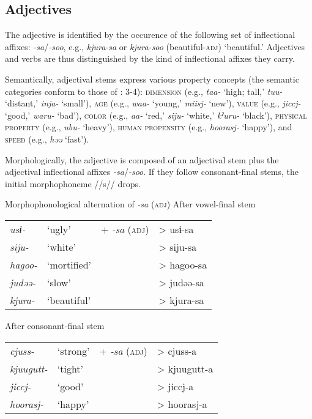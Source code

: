 \subsection{Adjectives}\label{sec:4.3.4}

The adjective is identified by the occurence of the following set of inflectional affixes: \textit{{}-sa}/\textit{{}-soo}, e.g., \textit{kjura-sa} or \textit{kjura-soo} (beautiful-\textsc{adj}) ‘beautiful.’ Adjectives and verbs are thus distinguished by the kind of inflectional affixes they carry.

Semantically, adjectival stems express various property concepts (the semantic categories conform to those of \citealt{Dixon2004}: 3-4): \textsc{dimension} (e.g., \textit{taa-} ‘high; tall,’ \textit{tuu-} ‘distant,’ \textit{inja-} ‘small’), \textsc{age} (e.g., \textit{waa-} ‘young,’ \textit{miisj-} ‘new’), \textsc{value} (e.g., \textit{jiccj-} ‘good,’ \textit{waru-} ‘bad’), \textsc{color} (e.g., \textit{aa-} ‘red,’ \textit{siju-} ‘white,’ \textit{kˀuru-} ‘black’), \textsc{physical} \textsc{property} (e.g., \textit{ubu-} ‘heavy’), \textsc{human} \textsc{propensity} (e.g., \textit{hoorasj-} ‘happy’), and \textsc{speed} (e.g., \textit{həə} ‘fast’).

Morphologically, the adjective is composed of an adjectival stem plus the adjectival inflectional affixes \textit{{}-sa}/\textit{{}-soo}. If they follow consonant-final stems, the initial morphophoneme //s// drops.

\ea  Morphophonological alternation of \textit{{}-sa} (\textsc{adj}) \label{ex:4.49}
  \ea After vowel-final stem\\
\begin{tabular}{@{}llll@{}}
    \textit{usɨ-}   & ‘ugly’        & +  \textit{{}-sa} (\textsc{adj}) & >  usɨ-sa  \\
    \textit{siju-}  & ‘white’       &                         & >  siju-sa \\
    \textit{hagoo-} &  ‘mortified’  &                         & >  hagoo-sa\\
    \textit{judəə-} &  ‘slow’       &                         & >  judəə-sa\\
    \textit{kjura-} &  ‘beautiful’  &                         & >  kjura-sa\\
\end{tabular}
\ex After consonant-final stem\\
\begin{tabular}{@{}llll@{}}
    \textit{cjuss-}    & ‘strong’ & +  \textit{{}-sa} (\textsc{adj}) & >  cjuss-a   \\
    \textit{kjuugutt-} & ‘tight’  &                         & >  kjuugutt-a\\
    \textit{jiccj-}    & ‘good’   &                         & >  jiccj-a   \\
    \textit{hoorasj-}  & ‘happy’  &                         & >  hoorasj-a \\
\end{tabular}
\z
\z

